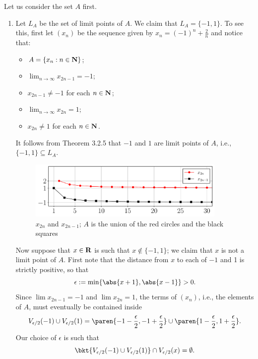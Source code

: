 \documentclass{lew98_solutions}
\begin{document}
\begin{solution}
    Let us consider the set \( A \) first.
    \begin{enumerate}
        \item Let \( L_A \) be the set of limit points of \( A \). We claim that \( L_A = \{ -1, 1 \} \). To see this, first let \( (x_n) \) be the sequence given by \( x_n = (-1)^n + \tfrac{2}{n} \) and notice that:
        \begin{itemize}
            \item \( A = \{ x_n : n \in \mathbf{N} \} \);

            \item \( \lim_{n \to \infty} x_{2n-1} = -1 \);

            \item \( x_{2n-1} \neq -1 \) for each \( n \in \mathbf{N} \);

            \item \( \lim_{n \to \infty} x_{2n} = 1 \);

            \item \( x_{2n} \neq 1 \) for each \( n \in \mathbf{N} \).
        \end{itemize}
        It follows from Theorem 3.2.5 that \( -1 \) and \( 1 \) are limit points of \( A \), i.e., \( \{ -1, 1 \} \subseteq L_A \).
        \begin{figure}[H]
            \centering
            \includegraphics[width=0.9\textwidth]{UA_Figures/UA_ex3_2_2_fig.pdf}
            \caption{\( x_{2n} \) and \( x_{2n-1} \); \( A \) is the union of the red circles and the black squares}
            \label{fig:ex3.2.2}
        \end{figure}
        \noindent Now suppose that \( x \in \mathbf{R} \) is such that \( x \not\in \{ -1, 1 \} \); we claim that \( x \) is not a limit point of \( A \). First note that the distance from \( x \) to each of \( -1 \) and 1 is strictly positive, so that
        \[
            \epsilon := \min \{ \abs{x + 1}, \abs{x - 1} \} > 0.
        \]
        Since \( \lim x_{2n-1} = -1 \) and \( \lim x_{2n} = 1 \), the terms of \( (x_n) \), i.e., the elements of \( A \), must eventually be contained inside
        \[
            V_{\epsilon/2}(-1) \cup V_{\epsilon/2}(1) = \paren{ -1 - \frac{\epsilon}{2}, -1 + \frac{\epsilon}{2} } \cup \paren{ 1 - \frac{\epsilon}{2}, 1 + \frac{\epsilon}{2} }.
        \]
        Our choice of \( \epsilon \) is such that
        \[
            \bkt{ V_{\epsilon/2}(-1) \cup V_{\epsilon/2}(1) } \cap V_{\epsilon/2}(x) = \emptyset.
        \]
        \begin{center}
\end{center}
\end{enumerate}
\end{solution}
\end{document}
